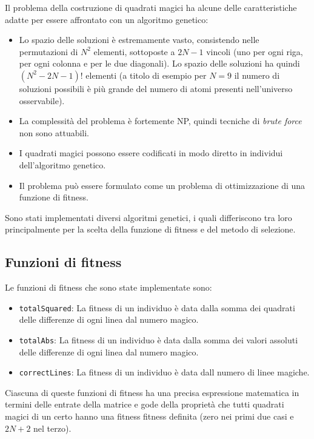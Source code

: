 \documentclass[italian,twoside,twocolumn]{article}
\begin{document}
\noindent
Il problema della costruzione di quadrati magici ha alcune delle caratteristiche adatte per essere affrontato con un algoritmo genetico:
\begin{itemize}
	\item Lo spazio delle soluzioni è estremamente vasto, consistendo nelle permutazioni di $ N^2 $ elementi, sottoposte a $ 2 N - 1 $ vincoli (uno per ogni riga, per ogni colonna e per le due diagonali). Lo spazio delle soluzioni ha quindi $ (N^2 - 2N - 1)! $ elementi (a titolo di esempio per $ N = 9 $ il numero di soluzioni possibili è più grande del numero di atomi presenti nell'universo osservabile). 
	\item La complessità del problema è fortemente NP, quindi tecniche di \emph{brute force} non sono attuabili.
	\item I quadrati magici possono essere codificati in modo diretto in individui dell'algoritmo genetico.
	\item Il problema può essere formulato come un problema di ottimizzazione di una funzione di fitness.
\end{itemize}
Sono stati implementati diversi algoritmi genetici, i quali differiscono tra loro principalmente per la scelta della funzione di fitness e del metodo di selezione. 

\subsection{Funzioni di fitness}
Le funzioni di fitness che sono state implementate sono: 
\begin{itemize}
	\item \texttt{totalSquared}: La fitness di un individuo è data dalla somma dei quadrati delle differenze di ogni linea dal numero magico.
	\item \texttt{totalAbs}: La fitness di un individuo è data dalla somma dei valori assoluti delle differenze di ogni linea dal numero magico.
	\item \texttt{correctLines}: La fitness di un individuo è data dall numero di linee magiche. 
\end{itemize}
Ciascuna di queste funzioni di fitness ha una precisa espressione matematica in termini delle entrate della matrice e gode della proprietà che tutti quadrati magici di un certo hanno una fitness fitness definita (zero nei primi due casi e $ 2N + 2 $ nel terzo). 
\end{document}
